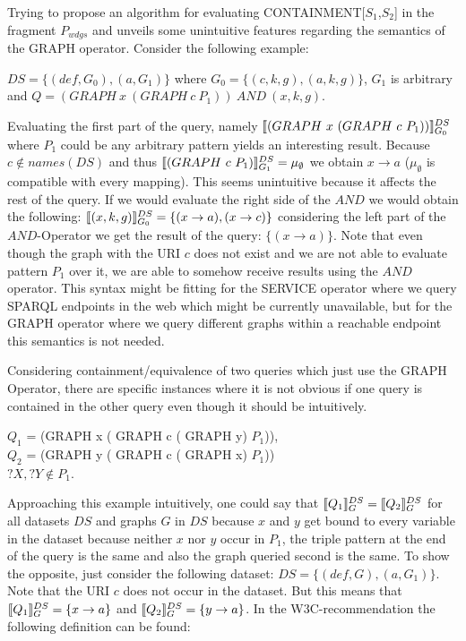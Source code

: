 			Trying to propose an algorithm for evaluating CONTAINMENT[$S_1$,$S_2$] in the
			fragment $P_{wdgs}$ and unveils some unintuitive features regarding the semantics of the
			GRAPH operator. Consider the following example:
			\begin{example}
				$DS=\{(def,G_0), (a,G_1) \}$ where $G_0 = \{
				(c,k,g), (a,k,g) \}$, $G_1$ is arbitrary and  $Q = (GRAPH \ x  \
				(GRAPH  \ c \  P_1)) \ AND \ (x,k,g)$.
			\end{example}

			Evaluating the first part of the query, namely $\llbracket(GRAPH \ x  \ (GRAPH  \
			c \  P_1))\rrbracket^{DS}_{G_0} $ where $P_1$ could be any arbitrary
			pattern yields an interesting result. Because $c \notin	names(DS)$ 
			and thus $\llbracket (GRAPH \ c  \ P_1) \rrbracket^{DS}_{G_1} = \mu_\emptyset$  we
			obtain $x \rightarrow a$ ($\mu_\emptyset$ is compatible with every
			mapping). This seems unintuitive because it affects the rest of the query.
			If we would evaluate the right side of the $AND$ we would obtain the
			following: $\llbracket(x,k,g)\rrbracket^{DS}_{G_0} = \{ (x \rightarrow a) , (x \rightarrow c) \}$ considering the
			left part of the $AND$-Operator we get the result of the query: $\{ (x \rightarrow a )
			\}$. Note that even though the graph with the URI $c$ does not exist and we are not able
			to evaluate pattern $P_1$ over it, we are able to somehow receive results using
			the $AND$ operator. This syntax might be fitting for the SERVICE
			operator where we query SPARQL endpoints in the web which might be
			currently unavailable, but for the GRAPH operator where we query
			different graphs within a reachable endpoint
			this semantics is not needed.
			\bigskip

			\noindent Considering containment/equivalence of two queries which just use the GRAPH
			Operator, there are specific instances where it is not obvious if one query is contained in the other query even though it should be intuitively.

			\begin{example}
				$Q_1$ = (GRAPH x ( GRAPH c ( GRAPH y) $P_1$)),\\ 
				$Q_2$ = (GRAPH y ( GRAPH c ( GRAPH x) $ P_1$))\\
				$?X,?Y \notin P_1$.
			\end{example}

			Approaching this example intuitively, one could say that $\llbracket Q_1
			\rrbracket^{DS}_{G} = \llbracket Q_2 \rrbracket^{DS}_G$ for all datasets $DS$ and graphs
			$G$ in $DS$ because $x$ and $y$ get bound to every variable in the dataset because neither
			$x$ nor $y$ occur in $P_1$, the triple pattern at the end
			of the query is the same and also the graph queried second is the same. 
			To show the opposite, just  consider the following dataset:
			$DS=\{(def,G), (a,G_1)\}$. Note that the URI $c$ does not occur in the dataset.
			But this means that $\llbracket Q_1 \rrbracket^{DS}_G = \{x \rightarrow a\}$ and  $\llbracket Q_2
			\rrbracket^{DS}_G = \{y \rightarrow a\}$.			
			In the W3C-recommendation\cite{w3standard} 
			the following definition can be found:

